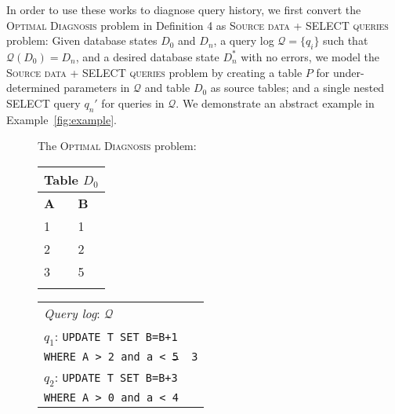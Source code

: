 In order to use these works to diagnose query history, we first convert the
\textsc{Optimal Diagnosis} problem in Definition 4 as \textsc{Source data +
SELECT queries} problem: Given database states $D_0$ and $D_n$, a query log
$\mathcal{Q} = \{q_i\}$ such that $\mathcal{Q}(D_0) = D_n$, and a desired
database state $D_n^*$ with no errors, we model the \textsc{Source data +
SELECT queries} problem by creating a table $P$ for under-determined
parameters in $\mathcal{Q}$ and table $D_0$ as source tables; and a single
nested SELECT query $q_n'$ for queries in $\mathcal{Q}$. We demonstrate an
abstract example in Example~\ref{fig:example}.

\begin{figure}[t]
The \textsc{Optimal Diagnosis} problem:\\
    \begin{minipage}[t]{0.1\textwidth}
         \vspace{0pt} 
         \centering
        \begin{tabular}{ll}
            \multicolumn{2}{l}{Table $D_0$}\\
            \toprule
            \textbf{A}  & \textbf{B}\\
            \midrule
			 1 & 1 \\
			 2 & 2 \\
			 3 & 5 \\
            \bottomrule
            \\
        \end{tabular}
    \end{minipage}
    \begin{minipage}[t]{0.2\textwidth}
         \vspace{0pt} 
         \centering
        \begin{tabular}{p{26ex}}
            \multicolumn{1}{l}{\emph{Query log}: $\mathcal{Q}$}\\
            $q_1$: \texttt{\small UPDATE T SET B=B+1}\\
            \texttt{\small WHERE A > 2 and a < \sout{5} {\color{red} 3}} \\
            $q_2$: \texttt{\small UPDATE T SET B=B+3}\\
                  \texttt{\small WHERE A > 0 and a < 4} \\
        \end{tabular}
    \end{minipage}
    \begin{minipage}[t]{0.16\textwidth}
         \vspace{0pt} 

\end{minipage}
\end{figure}
